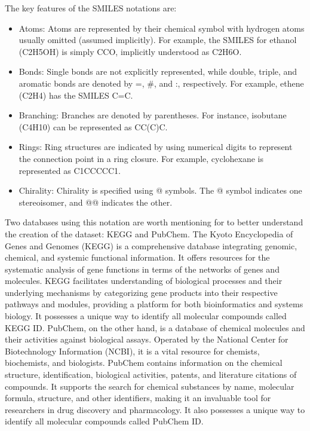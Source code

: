 The key features of the SMILES notations are:
\begin{itemize}
  \item Atoms: Atoms are represented by their chemical symbol with hydrogen atoms usually 
  omitted (assumed implicitly). For example, the SMILES for ethanol (C2H5OH) is simply CCO, 
  implicitly understood as C2H6O.
  \item Bonds: Single bonds are not explicitly represented, while double, triple, 
  and aromatic bonds are denoted by =, \#, and :, respectively. For example, ethene (C2H4) 
  has the SMILES C=C.
  \item Branching: Branches are denoted by parentheses. For instance, isobutane (C4H10) can be 
  represented as CC(C)C.
  \item Rings: Ring structures are indicated by using numerical digits to represent the 
  connection point in a ring closure. For example, cyclohexane is represented as C1CCCCC1.
  \item Chirality: Chirality is specified using @ symbols. The @ symbol indicates one stereoisomer, 
  and @@ indicates the other.
\end{itemize}

Two databases using this notation are worth mentioning for to better understand the creation of the dataset:
KEGG and PubChem. \cite{kegg,pubmec} The Kyoto Encyclopedia of Genes and Genomes (KEGG) is a 
comprehensive database integrating genomic, chemical, and systemic functional information. 
It offers resources for the systematic analysis of gene functions in terms of the networks of 
genes and molecules. KEGG facilitates understanding of biological processes and their underlying 
mechanisms by categorizing gene products into their respective pathways and modules, providing a 
platform for both bioinformatics and systems biology. It possesses a unique way to identify all molecular
compounds called KEGG ID.
PubChem, on the other hand, is a database of chemical molecules and their activities 
against biological assays. Operated by the National Center for Biotechnology Information (NCBI), 
it is a vital resource for chemists, biochemists, and biologists. 
PubChem contains information on the chemical structure, identification, biological activities, 
patents, and literature citations of compounds. It supports the search for chemical substances 
by name, molecular formula, structure, and other identifiers, making it an invaluable tool for 
researchers in drug discovery and pharmacology. It also possesses a unique way to identify all molecular
compounds called PubChem ID.

